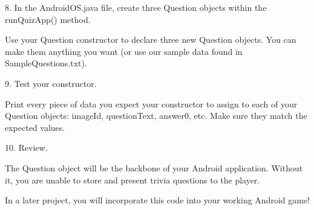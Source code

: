     8.
    In the AndroidOS.java file, create three Question objects within the runQuizApp() method.

    Use your Question constructor to declare three new Question objects. You can make them anything you want (or use our sample data found in SampleQuestions.txt).

    9.
    Test your constructor.

    Print every piece of data you expect your constructor to assign to each of your Question objects: imageId, questionText, answer0, etc. Make sure they match the expected values.

    10.
    Review.

    The Question object will be the backbone of your Android application. Without it, you are unable to store and present trivia questions to the player.

    In a later project, you will incorporate this code into your working Android game!
